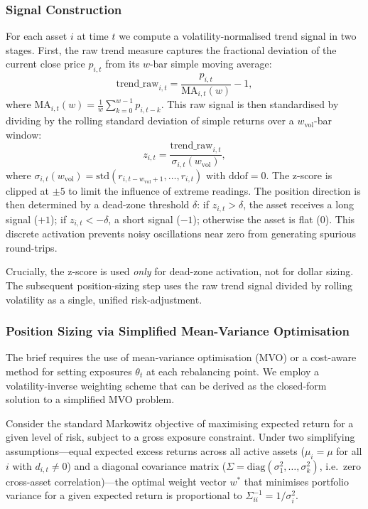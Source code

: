 \documentclass[11pt,a4paper]{article}
\begin{document}
\subsubsection{Signal Construction}

For each asset $i$ at time $t$ we compute a volatility-normalised trend signal in two stages.  First, the raw trend measure captures the fractional deviation of the current close price $p_{i,t}$ from its $w$-bar simple moving average:
\begin{equation}
  \text{trend\_raw}_{i,t} = \frac{p_{i,t}}{\text{MA}_{i,t}(w)} - 1,
  \label{eq:trend-raw}
\end{equation}
where $\text{MA}_{i,t}(w) = \frac{1}{w}\sum_{k=0}^{w-1} p_{i,t-k}$.  This raw signal is then standardised by dividing by the rolling standard deviation of simple returns over a $w_{\text{vol}}$-bar window:
\begin{equation}
  z_{i,t} = \frac{\text{trend\_raw}_{i,t}}{\sigma_{i,t}(w_{\text{vol}})},
  \label{eq:trend-z}
\end{equation}
where $\sigma_{i,t}(w_{\text{vol}}) = \text{std}(r_{i,t-w_{\text{vol}}+1}, \ldots, r_{i,t})$ with $\text{ddof}=0$.  The z-score is clipped at $\pm 5$ to limit the influence of extreme readings.  The position direction is then determined by a dead-zone threshold $\delta$: if $z_{i,t} > \delta$, the asset receives a long signal ($+1$); if $z_{i,t} < -\delta$, a short signal ($-1$); otherwise the asset is flat ($0$).  This discrete activation prevents noisy oscillations near zero from generating spurious round-trips.

Crucially, the z-score is used \emph{only} for dead-zone activation, not for dollar sizing.  The subsequent position-sizing step uses the raw trend signal divided by rolling volatility as a single, unified risk-adjustment.

\subsubsection{Position Sizing via Simplified Mean-Variance Optimisation}
\label{sec:mvo}

The brief requires the use of mean-variance optimisation (MVO) or a cost-aware method for setting exposures $\theta_t$ at each rebalancing point.  We employ a volatility-inverse weighting scheme that can be derived as the closed-form solution to a simplified MVO problem.

Consider the standard Markowitz objective of maximising expected return for a given level of risk, subject to a gross exposure constraint.  Under two simplifying assumptions---equal expected excess returns across all active assets ($\mu_i = \mu$ for all $i$ with $d_{i,t} \neq 0$) and a diagonal covariance matrix ($\Sigma = \text{diag}(\sigma_1^2, \ldots, \sigma_k^2)$, i.e.\ zero cross-asset correlation)---the optimal weight vector $w^*$ that minimises portfolio variance for a given expected return is proportional to $\Sigma^{-1}_{ii} = 1/\sigma_i^2$.
\end{document}
